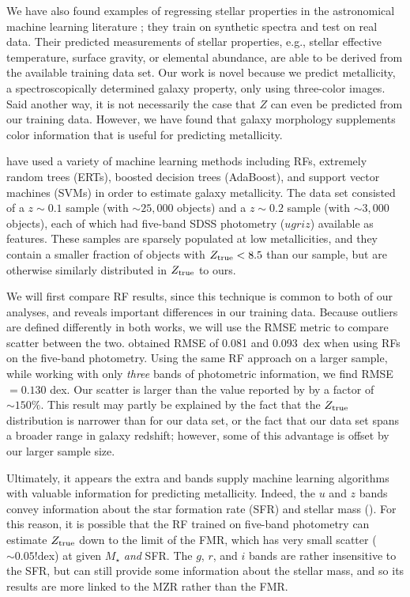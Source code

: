 \documentclass[fleqn,usenatbib]{mnras}
\begin{document}
We have also found examples of regressing stellar properties in the astronomical machine learning literature \citep[see, e.g.,][]{2000A&A...357..197B,2018MNRAS.475.2978F}; they train on synthetic spectra and test on real data. Their predicted measurements of stellar properties, e.g., stellar effective temperature, surface gravity, or elemental abundance, are able to be derived from the available training data set. Our work is novel because we predict metallicity, a spectroscopically determined galaxy property, only using three-color images. Said another way, it is not necessarily the case that $Z$ can even be predicted from our training data. However, we have found that galaxy morphology supplements color information that is useful for predicting metallicity.

\cite{Acquaviva2016} have used a variety of machine learning methods including RFs, extremely random trees (ERTs), boosted decision trees (AdaBoost), and support vector machines (SVMs) in order to estimate galaxy metallicity. The \cite{Acquaviva2016} data set consisted of a $z \sim 0.1$ sample (with $\sim 25,000$ objects) and a $z \sim 0.2$ sample (with $\sim 3,000$ objects), each of which had five-band SDSS photometry ($ugriz$) available as features. These samples are sparsely populated at low metallicities, and they contain a smaller fraction of objects with $Z_{\rm true} < 8.5$ than our sample, but are otherwise similarly distributed in $Z_{\rm true}$ to ours.

We will first compare RF results, since this technique is common to both of our analyses, and reveals important differences in our training data. Because outliers are defined differently in both works, we will use the RMSE metric to compare scatter between the two. \cite{Acquaviva2016} obtained RMSE of 0.081 and 0.093~dex when using RFs on the five-band photometry. Using the same RF approach on a larger sample, while working with only \textit{three} bands of photometric information, we find RMSE $= 0.130$ dex. Our scatter is larger than the value reported by \cite{Acquaviva2016} by a factor of $\sim 150\%$. This result may partly be explained by the fact that the $Z_{\rm true}$ distribution is narrower than for our data set, or the fact that our data set spans a broader range in galaxy redshift; however, some of this advantage is offset by our larger sample size.

Ultimately, it appears the extra \sdssu and \sdssz bands supply machine learning algorithms with valuable information for predicting metallicity. %
Indeed, the $u$ and $z$ bands convey information about the star formation rate (SFR) and stellar mass (\mstar). For this reason, it is possible that the RF trained on five-band photometry can estimate $Z_{\rm true}$ down to the limit of the FMR, which has very small scatter ($\sim 0.05$!dex) at given $M_{\star}$ \textit{and} SFR. The $g$, $r$, and $i$ bands are rather insensitive to the SFR, but can still provide some information about the stellar mass, and so its results are more linked to the MZR rather than the FMR.
\end{document}
